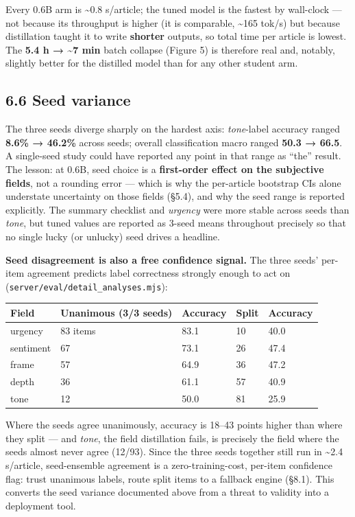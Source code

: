 \documentclass[11pt]{article}
\begin{document}
Every 0.6B arm is \textasciitilde0.8 s/article; the tuned model is the
fastest by wall-clock --- not because its throughput is higher (it is
comparable, \textasciitilde165 tok/s) but because distillation taught it
to write \textbf{shorter} outputs, so total time per article is lowest.
The \textbf{5.4 h → \textasciitilde7 min} batch collapse (Figure 5) is
therefore real and, notably, slightly better for the distilled model
than for any other student arm.

\subsection{6.6 Seed variance}\label{seed-variance}

The three seeds diverge sharply on the hardest axis: \emph{tone}-label
accuracy ranged \textbf{8.6\% → 46.2\%} across seeds; overall
classification macro ranged \textbf{50.3 → 66.5}. A single-seed study
could have reported any point in that range as ``the'' result. The
lesson: at 0.6B, seed choice is a \textbf{first-order effect on the
subjective fields}, not a rounding error --- which is why the
per-article bootstrap CIs alone understate uncertainty on those fields
(§5.4), and why the seed range is reported explicitly. The summary
checklist and \emph{urgency} were more stable across seeds than
\emph{tone}, but tuned values are reported as 3-seed means throughout
precisely so that no single lucky (or unlucky) seed drives a headline.

\textbf{Seed disagreement is also a free confidence signal.} The three
seeds' per-item agreement predicts label correctness strongly enough to
act on (\texttt{server/eval/detail\_analyses.mjs}):

\begin{longtable}[]{@{}lllll@{}}
\toprule\noalign{}
Field & Unanimous (3/3 seeds) & Accuracy & Split & Accuracy \\
\midrule\noalign{}
\endhead
\bottomrule\noalign{}
\endlastfoot
urgency & 83 items & 83.1 & 10 & 40.0 \\
sentiment & 67 & 73.1 & 26 & 47.4 \\
frame & 57 & 64.9 & 36 & 47.2 \\
depth & 36 & 61.1 & 57 & 40.9 \\
tone & 12 & 50.0 & 81 & 25.9 \\
\end{longtable}

Where the seeds agree unanimously, accuracy is 18--43 points higher than
where they split --- and \emph{tone}, the field distillation fails, is
precisely the field where the seeds almost never agree (12/93). Since
the three seeds together still run in \textasciitilde2.4 s/article,
seed-ensemble agreement is a zero-training-cost, per-item confidence
flag: trust unanimous labels, route split items to a fallback engine
(§8.1). This converts the seed variance documented above from a threat
to validity into a deployment tool.
\end{document}
